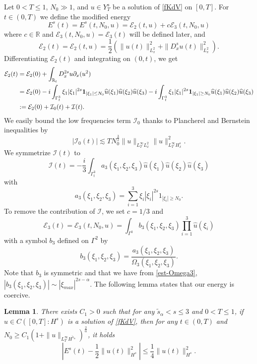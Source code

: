 \documentclass{amsart}
\newtheorem{lemma}[theorem]{Lemma}
\theoremstyle{definition}
\theoremstyle{remark}
\def\R{{\mathbb R}}
\numberwithin{equation}{section}
\begin{document}
Let $0<T\le 1$, $N_0\gg 1$, and $u\in Y^s_T$ be a solution of \eqref{fKdV} on $[0,T]$. For $t\in (0,T)$ we define the modified energy
\begin{equation}\label{def:Es}
E^s(t) = E^s(t,N_0,u) = \mathcal{E}_2(t,u) + c\mathcal{E}_3(t,N_0,u)
\end{equation}
where $c \in\R$ and $\mathcal{E}_3(t,N_0,u)=\mathcal{E}_3(t)$ will be defined later, and 
$$
\mathcal{E}_2(t) =\mathcal{E}_2(t,u)= \frac 12 \left( \|u(t)\|_{L^2_x}^2 +\|D_x^su(t)\|_{L^2_x}^2 \right).
$$
Differentiating $\mathcal{E}_2(t)$ and integrating on $(0,t)$, we get
\begin{align}
\mathcal{E}_2(t) &= \mathcal{E}_2(0) + \int_{\R_t} D^{2s}_xu \partial_x(u^2) \notag \\
& = \mathcal{E}_2(0) -i \int_{\Gamma^3_t} \xi_1| \xi_1|^{2s} {\bf 1}_{|\xi_1|\le N_0} \widehat{u}(\xi_1) \widehat{u}(\xi_2) \widehat{u}(\xi_3) -i \int_{\Gamma^3_t} \xi_1|\xi_1|^{2s}{\bf 1}_{|\xi_1|\ge N_0} \widehat{u}(\xi_1) \widehat{u}(\xi_2) \widehat{u}(\xi_3) \notag \\
&:= \mathcal{E}_2(0) + \mathcal{I}_0(t) + \mathcal{I}(t). \label{e2tilde}
\end{align}
We easily bound the low frequencies term $\mathcal{I}_0$ thanks to Plancherel and Bernstein inequalities by
\begin{equation}\label{est:I0}
  |\mathcal{I}_0(t)| \lesssim T N_0^{\frac 32}\|u\|_{L^\infty_TL^2_x}\|u\|_{L^\infty_TH^s_x}^2.
\end{equation}
We symmetrize $\mathcal{I}(t)$ to
\begin{equation} \label{def:I}
\mathcal{I}(t) = -\frac i3 \int_{\Gamma^3_t} a_3(\xi_1,\xi_2,\xi_3) \widehat{u}(\xi_1) \widehat{u}(\xi_2) \widehat{u}(\xi_3)
\end{equation}
with
$$
a_3(\xi_1,\xi_2,\xi_3) = \sum_{i=1}^3\xi_i |\xi_i|^{2s}1_{|\xi_i|\ge N_0}.
$$
To remove the contribution of $\mathcal{I}$, we set $c = 1/3$ and
\begin{equation} \label{def:E3}
\mathcal{E}_3(t)= \mathcal{E}_3(t,N_0,u)= \int_{\Gamma^3} b_3(\xi_1,\xi_2,\xi_3) \prod_{i=1}^3 \widehat{u}(\xi_i)
\end{equation}
with a symbol $b_3$ defined on $\Gamma^2$ by
$$
b_3(\xi_1,\xi_2,\xi_3) = \frac{a_3(\xi_1,\xi_2,\xi_3)}{\Omega_3(\xi_1,\xi_2,\xi_3)}.
$$
Note that $b_3$ is symmetric and that we have from \eqref{est-Omega3}, $|b_3(\xi_1,\xi_2,\xi_3)| \sim |\xi_{max}|^{2s-\alpha}$. The following lemma states that our energy is coercive.
\begin{lemma} \label{lemma:coer}
  There exists $C_1>0$ such that for any $\widetilde{s}_\alpha<s \le 3$ and $0<T\le 1$, if $u\in C([0,T] : H^s)$ is a solution of \eqref{fKdV}, then for any $t\in (0,T)$ and $N_0\ge  C_1 (1+\|u\|_{L^\infty_TH^{\widetilde{s}_\alpha}})^{\frac 2 \alpha}$, it holds
  \begin{equation}\label{coesive}
    \left| E^s(t) - \frac 12\|u(t)\|_{H^s}^2\right|\le \frac 14 \|u(t)\|_{H^s}^2.
  \end{equation}
\end{lemma}
\end{document}
